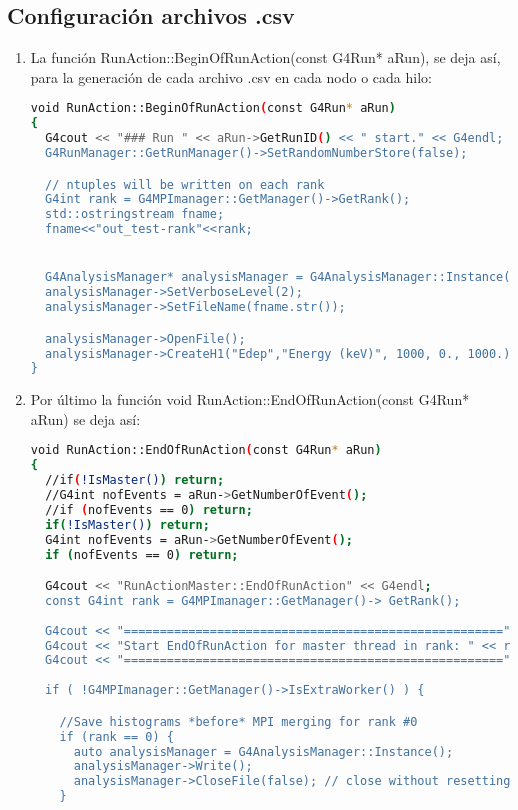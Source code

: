 \subsection{Configuración archivos .csv}

\begin{enumerate}
    
    \item La función RunAction::BeginOfRunAction(const G4Run* aRun), se deja así, para la generación de cada archivo .csv en cada nodo o cada hilo:
\begin{lstlisting}[language=bash,style=mystyle]
void RunAction::BeginOfRunAction(const G4Run* aRun)
{
  G4cout << "### Run " << aRun->GetRunID() << " start." << G4endl;
  G4RunManager::GetRunManager()->SetRandomNumberStore(false);

  // ntuples will be written on each rank
  G4int rank = G4MPImanager::GetManager()->GetRank();
  std::ostringstream fname;
  fname<<"out_test-rank"<<rank;


  G4AnalysisManager* analysisManager = G4AnalysisManager::Instance();
  analysisManager->SetVerboseLevel(2);
  analysisManager->SetFileName(fname.str());

  analysisManager->OpenFile();
  analysisManager->CreateH1("Edep","Energy (keV)", 1000, 0., 1000.); // Id = 0
}
\end{lstlisting}


    \item Por último la función void RunAction::EndOfRunAction(const G4Run* aRun) se deja así:
    
\begin{lstlisting}[language=bash,style=mystyle]
void RunAction::EndOfRunAction(const G4Run* aRun)
{
  //if(!IsMaster()) return;
  //G4int nofEvents = aRun->GetNumberOfEvent();
  //if (nofEvents == 0) return;
  if(!IsMaster()) return;
  G4int nofEvents = aRun->GetNumberOfEvent();
  if (nofEvents == 0) return;

  G4cout << "RunActionMaster::EndOfRunAction" << G4endl;
  const G4int rank = G4MPImanager::GetManager()-> GetRank();
 
  G4cout << "=====================================================" << G4endl;
  G4cout << "Start EndOfRunAction for master thread in rank: " << rank<<G4endl;
  G4cout << "=====================================================" << G4endl;
 
  if ( !G4MPImanager::GetManager()->IsExtraWorker() ) {

    //Save histograms *before* MPI merging for rank #0
    if (rank == 0) {
      auto analysisManager = G4AnalysisManager::Instance();
      analysisManager->Write();
      analysisManager->CloseFile(false); // close without resetting histograms 
    }



\end{lstlisting}
\end{enumerate}
